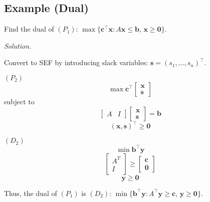 \subsection{Example (Dual)}
Find the dual of
$ (P_1)$: $\max \{\bm{c}^\top \bm{x}: A \bm{x}\le \bm{b},\,\bm{x}\ge \bm{0}\}$.

\emph{Solution.}

Convert to SEF by introducing slack variables: $ \bm{s}=(s_1,\ldots,s_n)^\top $.

$ (P_2) $
\[ \max \bm{c}^\top
\begin{bmatrix}
    \bm{x}\\
    \bm{s}
\end{bmatrix} \]
subject to
\[ \left[ \begin{array}{c|c}
    A & I
\end{array} \right]
\begin{bmatrix}
    \bm{x}\\
    \bm{s}
\end{bmatrix} = \bm{b} \]
\[ (\bm{x},\bm{s})^\top\ge \bm{0} \]

$ (D_2) $
\[ \min \bm{b}^\top \bm{y} \]
\[ \begin{bmatrix}
    A^T\\
    I
\end{bmatrix} \ge
\begin{bmatrix}
    \bm{c}\\
    \bm{0}
\end{bmatrix}\]
\[ \bm{y}\ge \bm{0} \]

Thus, the dual of $ (P_1) $ is $ (D_2) $: 
$\min\{\bm{b}^\top \bm{y}: A ^\top \bm{y}\ge \bm{c},\,\bm{y}\ge \bm{0}\}$.